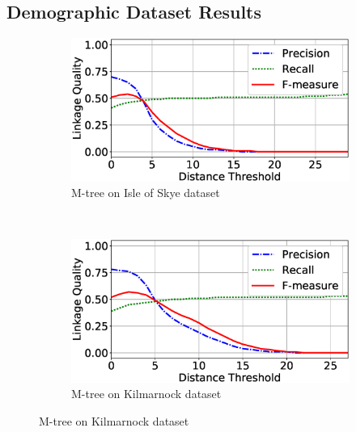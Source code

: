 \documentclass{llncs}
\begin{document}

\subsection{Demographic Dataset Results}

\begin{figure}[t]
\centering
\begin{subfigure}{.47\textwidth}
  \centering
\includegraphics[width=\textwidth]{figures/plotLQ-skye-mtree}
\caption{M-tree on Isle of Skye dataset\label{skye-quality-mtree}}
\end{subfigure}%
~~
\begin{subfigure}{.47\textwidth}
  \centering
\includegraphics[width=\textwidth]{figures/plotLQ-kilmarnock-mtree}
\caption{M-tree on Kilmarnock dataset \label{kilmarnock-quality-mtree}}
\end{subfigure} %


\end{figure}
\end{document}
